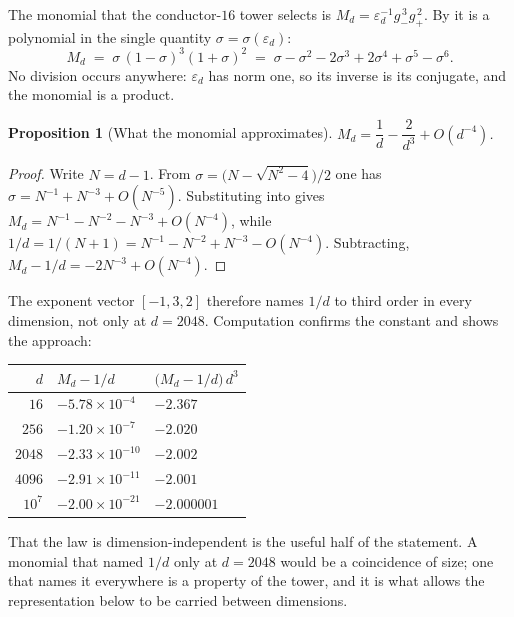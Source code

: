 \documentclass[12pt,a4paper]{article}
\newtheorem{proposition}[theorem]{Proposition}
\begin{document}
The monomial that the conductor-$16$ tower selects is
$M_d = \varepsilon_d^{-1} g_-^{\,3} g_+^{\,2}$. By  it is a
polynomial in the single quantity $\sigma = \sigma(\varepsilon_d)$:
\begin{equation}\label{eq:monomial-sigma}
  M_d \;=\; \sigma\,(1-\sigma)^3(1+\sigma)^2
        \;=\; \sigma - \sigma^2 - 2\sigma^3 + 2\sigma^4 + \sigma^5 - \sigma^6 .
\end{equation}
No division occurs anywhere: $\varepsilon_d$ has norm one, so its inverse is its
conjugate, and the monomial is a product.

\begin{proposition}[What the monomial approximates]
\label{prop:monomial}
$M_d = \dfrac{1}{d} - \dfrac{2}{d^{3}} + O\!\left(d^{-4}\right)$.
\end{proposition}

\begin{proof}
Write $N = d-1$. From $\sigma = \bigl(N - \sqrt{N^2-4}\bigr)/2$ one has
$\sigma = N^{-1} + N^{-3} + O(N^{-5})$. Substituting into
 gives $M_d = N^{-1} - N^{-2} - N^{-3} + O(N^{-4})$,
while $1/d = 1/(N+1) = N^{-1} - N^{-2} + N^{-3} - O(N^{-4})$. Subtracting,
$M_d - 1/d = -2N^{-3} + O(N^{-4})$.
\end{proof}

The exponent vector $[-1,3,2]$ therefore names $1/d$ to third order in every
dimension, not only at $d=2048$. Computation confirms the constant and shows the
approach:

\begin{center}
\begin{tabular}{@{}rll@{}}
\toprule
$d$ & $M_d - 1/d$ & $\bigl(M_d - 1/d\bigr)\,d^{3}$ \\
\midrule
$16$      & $-5.78\times10^{-4}$  & $-2.367$ \\
$256$     & $-1.20\times10^{-7}$  & $-2.020$ \\
$2048$    & $-2.33\times10^{-10}$ & $-2.002$ \\
$4096$    & $-2.91\times10^{-11}$ & $-2.001$ \\
$10^{7}$  & $-2.00\times10^{-21}$ & $-2.000001$ \\
\bottomrule
\end{tabular}
\end{center}

That the law is dimension-independent is the useful half of the statement. A
monomial that named $1/d$ only at $d=2048$ would be a coincidence of size; one
that names it everywhere is a property of the tower, and it is what allows the
representation below to be carried between dimensions.
\end{document}
